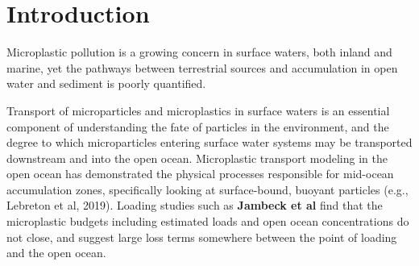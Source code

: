 \documentclass[draft]{jgr/agujournal2019}
\begin{document}

%
%
%
%


\section{Introduction}
  Microplastic pollution is a growing concern in surface waters, both
  inland and marine, yet the pathways between terrestrial sources and
  accumulation in open water and sediment is poorly quantified.

  Transport of microparticles and microplastics in surface waters is
  an essential component of understanding the fate of particles in the
  environment, and the degree to which microparticles entering surface
  water systems may be transported downstream and into the open
  ocean. Microplastic transport modeling in the open ocean has
  demonstrated the physical processes responsible for mid-ocean
  accumulation zones, specifically looking at surface-bound, buoyant
  particles (e.g., Lebreton et al, 2019).
  Loading studies such as {\bf
  Jambeck et al} find that the microplastic budgets including
  estimated loads and open ocean concentrations do not close, and
  suggest large loss terms somewhere between the point of loading and
  the open ocean.
\end{document}
